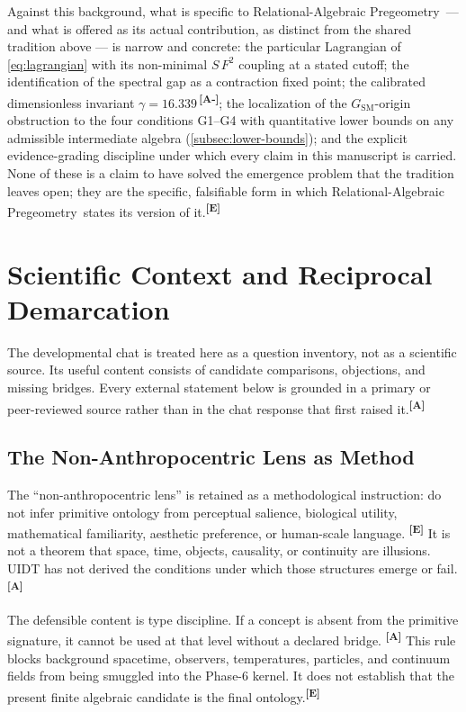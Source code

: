 \documentclass[12pt,a4paper,twoside]{article}
\theoremstyle{plain}
\theoremstyle{definition}
\theoremstyle{remark}
\newcommand{\ProjectShort}{Relational-Algebraic Pregeometry}
\newcommand{\RAP}{\ProjectShort}
\newcommand{\catmark}[1]{\textsuperscript{\textsf{\textbf{[#1]}}}}
\newcommand{\GammaGeom}{16.339} %
\begin{document}
\noindent Against this background, what is specific to \RAP\ --- and
what is offered as its actual contribution, as distinct from the shared
tradition above --- is narrow and concrete: the particular Lagrangian of
\cref{eq:lagrangian} with its non-minimal $S\,F^2$ coupling at a stated
cutoff; the identification of the spectral gap as a contraction fixed
point; the calibrated dimensionless invariant $\gamma =
\GammaGeom$\,\catmark{A-}; the localization of the
$G_{\mathrm{SM}}$-origin obstruction to the four conditions G1--G4 with
quantitative lower bounds on any admissible intermediate algebra
(\cref{subsec:lower-bounds}); and the explicit evidence-grading
discipline under which every claim in this manuscript is carried. None of
these is a claim to have solved the emergence problem that the tradition
leaves open; they are the specific, falsifiable form in which \RAP\
states its version of it.\catmark{E}

\section{Scientific Context and Reciprocal Demarcation}
\label{sec:ctx-scientific-context}

The developmental chat is treated here as a question inventory, not as a
scientific source. Its useful content consists of candidate comparisons,
objections, and missing bridges. Every external statement below is grounded in
a primary or peer-reviewed source rather than in the chat response that first
raised it.\catmark{A}

\subsection{The Non-Anthropocentric Lens as Method}
\label{subsec:ctx-nonanthropocentric-method}

The ``non-anthropocentric lens'' is retained as a methodological instruction:
do not infer primitive ontology from perceptual salience, biological utility,
mathematical familiarity, aesthetic preference, or human-scale language.
\catmark{E} It is not a theorem that space, time, objects, causality, or
continuity are illusions. UIDT has not derived the conditions under which those
structures emerge or fail.\catmark{A}

The defensible content is type discipline. If a concept is absent from the
primitive signature, it cannot be used at that level without a declared bridge.
\catmark{A} This rule blocks background spacetime, observers, temperatures,
particles, and continuum fields from being smuggled into the Phase-6 kernel. It
does not establish that the present finite algebraic candidate is the final
ontology.\catmark{E}
\end{document}
